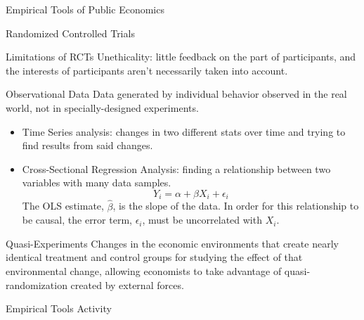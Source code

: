 \documentclass[8pt]{extarticle}
\begin{document}
\begin{problem}{Empirical Tools of Public Economics}
\begin{problem}{Randomized Controlled Trials}
\begin{problem}{Limitations of RCTs}
        Unethicality: little feedback on the part of participants, and the interests of participants aren't necessarily taken into account.
      \end{problem}
    \end{problem}
    \begin{problem}{Observational Data}
      Data generated by individual behavior observed in the real world, not in specially-designed experiments.
      \begin{itemize}
        \item Time Series analysis: changes in two different stats over time and trying to find results from said changes.
        \item Cross-Sectional Regression Analysis: finding a relationship between two variables with many data samples.
          \[
            Y_i = \alpha + \beta X_i + \epsilon_i
          \] 
          The OLS estimate, $\hat{\beta}$, is the slope of the data. In order for this relationship to be causal, the error term, $\epsilon_i$, must be uncorrelated with $X_i$.
      \end{itemize}
    \end{problem}
    \begin{problem}{Quasi-Experiments}
      Changes in the economic environments that create nearly identical treatment and control groups for studying the effect of that environmental change, allowing economists to take advantage of quasi-randomization created by external forces.
    \end{problem}
  \end{problem}
  \begin{problem}{Empirical Tools Activity}
   \begin{tcbraster}[raster columns = 1,colframe = black!75!white,colback=white]
   \end{tcbraster}
  \end{problem}
\end{document}
